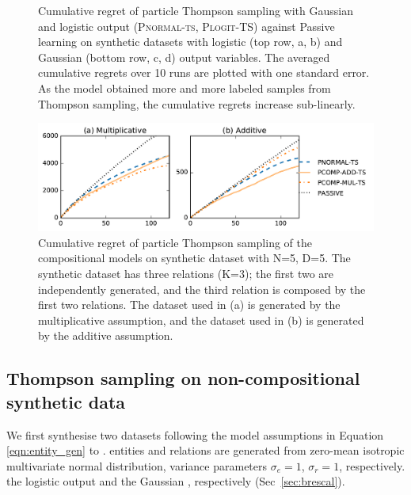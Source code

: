 \begin{figure}[t]
{	}
	\caption{\label{fig:synthetic} Cumulative regret of particle Thompson sampling with Gaussian and logistic output (\textsc{Pnormal-ts}, \textsc{Plogit}-TS) against Passive learning
	on synthetic datasets with logistic	(top row, a, b) and Gaussian (bottom row, c, d) output variables.
	The averaged cumulative regrets over 10 runs are plotted with one standard error.
	As the model obtained more and more labeled samples from Thompson sampling,
	the cumulative regrets increase sub-linearly.}
\end{figure}

\begin{figure}[t]
	\centering
	\includegraphics[width=\linewidth]{images/toy_comp_5_2_5.pdf}
	\caption{\label{fig:comp_synthetic} Cumulative regret of particle Thompson sampling of the compositional models on synthetic dataset with N=5, D=5. The synthetic dataset has three relations (K=3); the first two are independently generated, and the third relation is composed by the first two relations. The dataset used in (a) is generated by the multiplicative assumption, and the dataset used in (b) is generated by the additive assumption.}
\end{figure}

\subsection{Thompson sampling on non-compositional synthetic data}

We first synthesise two datasets
following the model assumptions in Equation \ref{eqn:entity_gen} to
\verify{\ref{eqn:triple_gen}}.
entities and relations are generated from zero-mean isotropic multivariate normal distribution, 
variance parameters $\sigma_e=1$, $\sigma_r=1$, respectively.
 the logistic output and the Gaussian , respectively (Sec~\ref{sec:brescal}).

